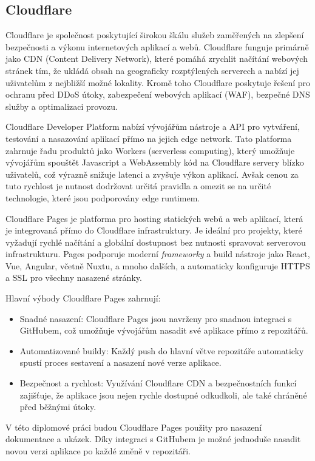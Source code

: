 \subsection{Cloudflare}
Cloudflare je společnost poskytující širokou škálu služeb zaměřených na zlepšení bezpečnosti a výkonu internetových aplikací a webů. Cloudflare funguje primárně jako CDN (Content Delivery Network), které pomáhá zrychlit načítání webových stránek tím, že ukládá obsah na geograficky rozptýlených serverech a nabízí jej uživatelům z nejbližší možné lokality. Kromě toho Cloudflare poskytuje řešení pro ochranu před DDoS útoky, zabezpečení webových aplikací (WAF), bezpečné DNS služby a optimalizaci provozu. \cite{Cloudflare}

Cloudflare Developer Platform nabízí vývojářům nástroje a API pro vytváření, testování a nasazování aplikací přímo na jejich edge network. Tato platforma zahrnuje řadu produktů jako Workers (serverless computing), který umožňuje vývojářům spouštět Javascript a WebAssembly kód na Cloudflare servery blízko uživatelů, což výrazně snižuje latenci a zvyšuje výkon aplikací. Avšak cenou za tuto rychlost je nutnost dodržovat určitá pravidla a omezit se na určité technologie, které jsou podporovány edge runtimem. \cite{CloudflareDeveloperPlatform}

Cloudflare Pages je platforma pro hosting statických webů a web aplikací, která je integrovaná přímo do Cloudflare infrastruktury. Je ideální pro projekty, které vyžadují rychlé načítání a globální dostupnost bez nutnosti spravovat serverovou infrastrukturu. Pages podporuje moderní \emph{frameworky} a build nástroje jako React, Vue, Angular, včetně Nuxtu, a mnoho dalších, a automaticky konfiguruje HTTPS a SSL pro všechny nasazené stránky. \cite{CloudflarePages}

Hlavní výhody Cloudflare Pages zahrnují:

\begin{itemize}
    \item Snadné nasazení: Cloudflare Pages jsou navrženy pro snadnou integraci s GitHubem, což umožňuje vývojářům nasadit své aplikace přímo z repozitářů.
    \item Automatizované buildy: Každý push do hlavní větve repozitáře automaticky spustí proces sestavení a nasazení nové verze aplikace.
    \item Bezpečnost a rychlost: Využívání Cloudflare CDN a bezpečnostních funkcí zajišťuje, že aplikace jsou nejen rychle dostupné odkudkoli, ale také chráněné před běžnými útoky.
\end{itemize}

V této diplomové práci budou Cloudflare Pages použity pro nasazení dokumentace a ukázek. Díky integraci s GitHubem je možné jednoduše nasadit novou verzi aplikace po každé změně v repozitáři.
